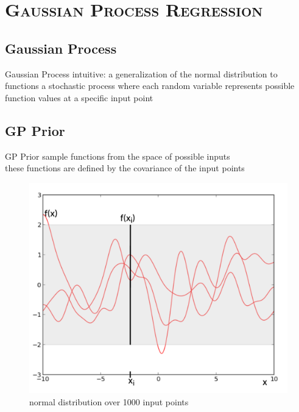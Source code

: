 \documentclass[xcolor=x11names,compress]{beamer}
\begin{document}
    \section{\scshape Gaussian Process Regression}
    \subsection{Gaussian Process}
    \begin{frame}{Gaussian Process}
        intuitive: a generalization of the normal distribution to functions
        \bigskip
        a stochastic process where each random variable represents possible function values at a specific input point
    \end{frame}

    \subsection{GP Prior}
    \begin{frame}{GP Prior}
        sample functions from the space of possible inputs\\
        these functions are defined by the covariance of the input points\\
        \begin{figure}
            \centering
            \includegraphics[width=.6\textwidth]{../resources/figures/gp_prior_new.pdf}
            \caption{normal distribution over 1000 input points}
        \end{figure}

    \end{frame}

\end{document}
